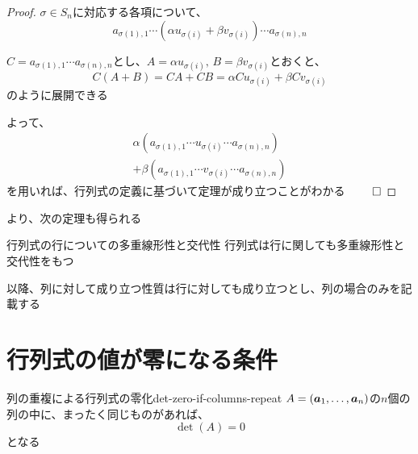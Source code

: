 \documentclass[../../../topic_linear-algebra]{subfiles}
\begin{document}
\begin{proof}
  $\sigma \in S_n$に対応する各項について、
  \begin{equation*}
    a_{\sigma(1),1} \cdots (\alpha u_{\sigma(i)} + \beta v_{\sigma(i)}) \cdots a_{\sigma(n),n}
  \end{equation*}

  $C = a_{\sigma(1),1} \cdots a_{\sigma(n),n}$とし、$A = \alpha u_{\sigma(i)}, \, B = \beta v_{\sigma(i)}$とおくと、
  \begin{equation*}
    C(A + B) = CA + CB = \alpha C u_{\sigma(i)} + \beta C v_{\sigma(i)}
  \end{equation*}
  のように展開できる

  よって、
  \begin{multline*}
    \alpha (a_{\sigma(1),1} \cdots u_{\sigma(i)} \cdots a_{\sigma(n),n}) \\
    + \beta(a_{\sigma(1),1} \cdots v_{\sigma(i)} \cdots a_{\sigma(n),n})
  \end{multline*}
  を用いれば、行列式の定義に基づいて定理が成り立つことがわかる $\qed$
\end{proof}

\sectionline

より、次の定理も得られる

\begin{theorem*}{行列式の行についての多重線形性と交代性}
  行列式は行に関しても多重線形性と交代性をもつ
\end{theorem*}

以降、列に対して成り立つ性質は行に対しても成り立つとし、列の場合のみを記載する

\sectionline
\section{行列式の値が零になる条件}

\begin{theorem}{列の重複による行列式の零化}{det-zero-if-columns-repeat}
  $A = (\vb*{a}_1, \ldots, \vb*{a}_n)$の$n$個の列の中に、まったく同じものがあれば、
  \begin{equation*}
    \det(A) = 0
  \end{equation*}
  となる
\end{theorem}
\end{document}
